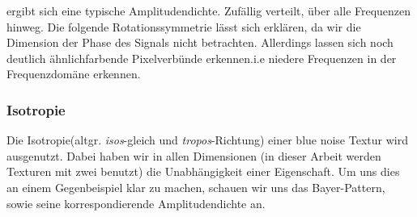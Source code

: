 ergibt sich eine typische Amplitudendichte. Zufällig verteilt, über alle 
Frequenzen hinweg. Die folgende Rotationssymmetrie lässt sich \cite{kiencke2009signale}
erklären, da wir die Dimension der Phase des Signals nicht betrachten.
Allerdings lassen sich noch deutlich
ähnlichfarbende Pixelverbünde erkennen.i.e niedere Frequenzen in der
Frequenzdomäne erkennen.

\subsubsection{Isotropie}

Die Isotropie(altgr. \textit{isos}-gleich und \textit{tropos}-Richtung)
einer blue noise Textur wird ausgenutzt. Dabei haben wir in allen
Dimensionen (in dieser Arbeit werden Texturen mit zwei benutzt) 
die Unabhängigkeit einer Eigenschaft. Um uns dies an einem Gegenbeispiel 
klar zu machen, schauen wir uns das Bayer-Pattern, sowie seine korrespondierende
Amplitudendichte an.

